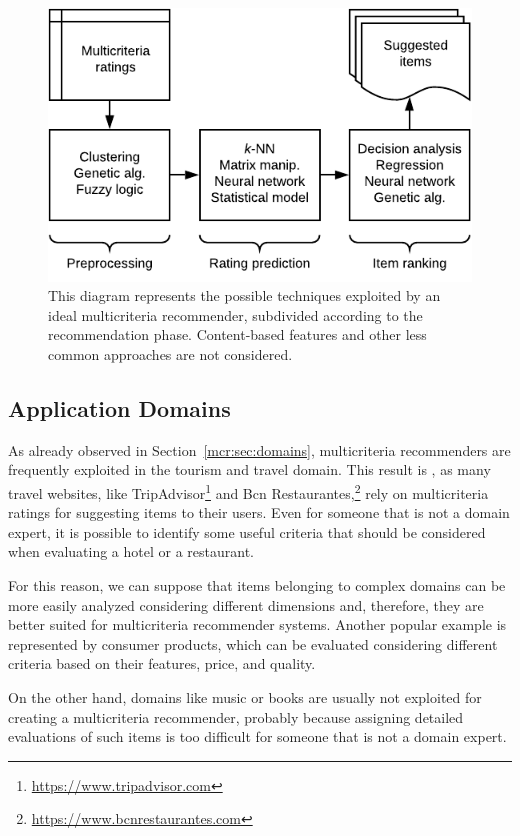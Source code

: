 \begin{figure}
\centering
\includegraphics[width=.9\textwidth]{multicriteria_techniques}
\caption[Ideal multicriteria recommender]{This diagram represents the possible techniques exploited by an ideal multicriteria recommender, subdivided according to the recommendation phase. Content-based features and other less common approaches are not considered.}
\label{mcr:fig:techniques}
\end{figure}

\subsection{Application Domains}

As already observed in Section~\ref{mcr:sec:domains}, multicriteria recommenders are frequently exploited in the tourism and travel domain. This result is , as many travel websites, like TripAdvisor\footnote{\url{https://www.tripadvisor.com}} and Bcn Restaurantes,\footnote{\url{https://www.bcnrestaurantes.com}} rely on multicriteria ratings for suggesting items to their users. Even for someone that is not a domain expert, it is possible to identify some useful criteria that should be considered when evaluating a hotel or a restaurant.

For this reason, we can suppose that items belonging to complex domains can be more easily analyzed considering different dimensions and, therefore, they are better suited for multicriteria recommender systems. Another popular example is represented by consumer products, which can be evaluated considering different criteria based on their features, price, and quality.

On the other hand, domains like music or books are usually not exploited for creating a multicriteria recommender, probably because assigning detailed evaluations of such items is too difficult for someone that is not a domain expert.

